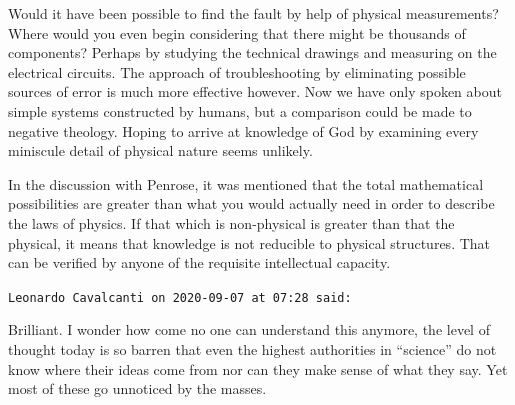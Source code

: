 \begin{footnotesize}
\begin{sffamily}
Would it have been possible to find the fault by help of physical measurements? Where would you even begin considering that there might be thousands of components? Perhaps by studying the technical drawings and measuring on the electrical circuits. The approach of troubleshooting by eliminating possible sources of error is much more effective however. Now we have only spoken about simple systems constructed by humans, but a comparison could be made to negative theology. Hoping to arrive at knowledge of God by examining every miniscule detail of physical nature seems unlikely.

In the discussion with Penrose, it was mentioned that the total mathematical possibilities are greater than what you would actually need in order to describe the laws of physics. If that which is non-physical is greater than that the physical, it means that knowledge is not reducible to physical structures. That can be verified by anyone of the requisite intellectual capacity.

\hfill

\texttt{Leonardo Cavalcanti on 2020-09-07 at 07:28 said:}

Brilliant. I wonder how come no one can understand this anymore, the level of thought today is so barren that even the highest authorities in ``science'' do not know where their ideas come from nor can they make sense of what they say. Yet most of these go unnoticed by the masses.

\end{sffamily}
\end{footnotesize}

